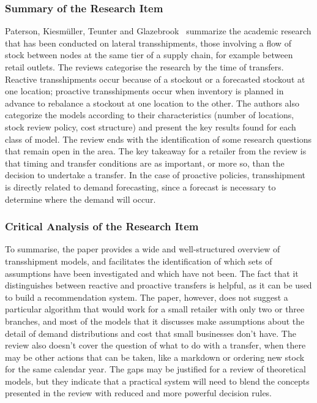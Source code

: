 \documentclass{StockSense}
\begin{document}
\subsubsection{Summary of the Research Item}

Paterson, Kiesm\"uller, Teunter and Glazebrook~\cite{paterson2011inventory} summarize the academic research that has been conducted on lateral transshipments, those involving a flow of stock between nodes at the same tier of a supply chain, for example between retail outlets. The reviews categorise the research by the time of transfers. Reactive transshipments occur because of a stockout or a forecasted stockout at one location; proactive transshipments occur when inventory is planned in advance to rebalance a stockout at one location to the other. The authors also categorize the models according to their characteristics (number of locations, stock review policy, cost structure) and present the key results found for each class of model. The review ends with the identification of some research questions that remain open in the area. The key takeaway for a retailer from the review is that timing and transfer conditions are as important, or more so, than the decision to undertake a transfer. In the case of proactive policies, transshipment is directly related to demand forecasting, since a forecast is necessary to determine where the demand will occur.

\subsubsection{Critical Analysis of the Research Item}

To summarise, the paper provides a wide and well-structured overview of transshipment models, and facilitates the identification of which sets of assumptions have been investigated and which have not been. The fact that it distinguishes between reactive and proactive transfers is helpful, as it can be used to build a recommendation system. The paper, however, does not suggest a particular algorithm that would work for a small retailer with only two or three branches, and most of the models that it discusses make assumptions about the detail of demand distributions and cost that small businesses don't have. The review also doesn't cover the question of what to do with a transfer, when there may be other actions that can be taken, like a markdown or ordering new stock for the same calendar year. The gaps may be justified for a review of theoretical models, but they indicate that a practical system will need to blend the concepts presented in the review with reduced and more powerful decision rules.
\end{document}

